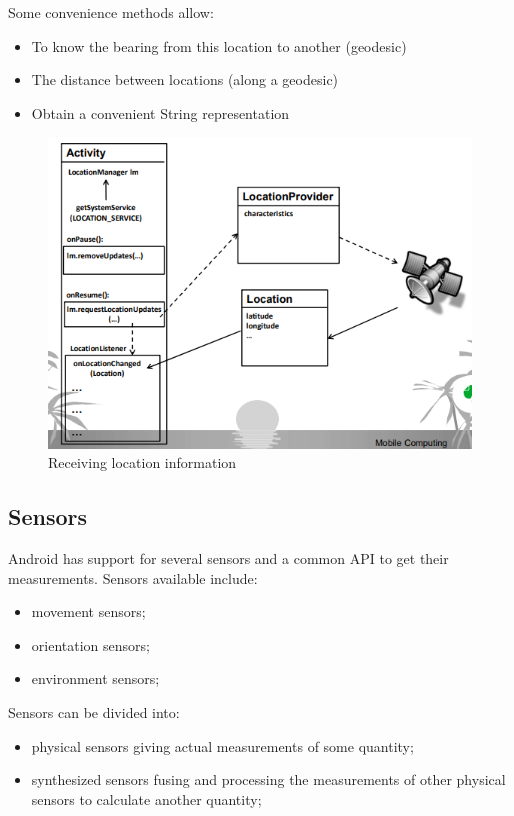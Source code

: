 Some convenience methods allow: 
\begin{itemize}
    \item To know the bearing from this location to another (geodesic)
    \item The distance between locations (along a geodesic)
    \item Obtain a convenient String representation
\end{itemize}

\begin{figure}[h]
\centering
\includegraphics[width=0.8\linewidth]{figures/07_receiving_location_information.png}
\caption{Receiving location information}
\label{fig:receiving_location_information}
\end{figure}

\subsection{Sensors}
Android has support for several sensors and a common API to get their measurements.
Sensors available include:
\begin{itemize}
    \item  movement sensors; 
    \item  orientation sensors;
    \item  environment sensors;
\end{itemize} 

Sensors can be divided into: 
\begin{itemize}
    \item physical sensors giving actual measurements of some quantity;
    \item synthesized sensors fusing and processing the measurements of other physical sensors to calculate another quantity;
\end{itemize}

